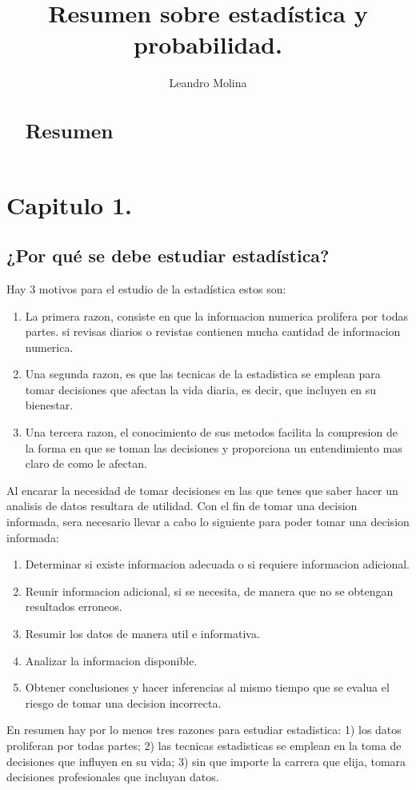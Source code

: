 \documentclass[]{article}
\title{Resumen sobre estadística y probabilidad.}
\author{Leandro Molina}
\begin{document}
\maketitle

\begin{abstract}
	\section*{Resumen}
\end{abstract}
\pagebreak

\tableofcontents

\pagebreak
\section{Capitulo 1.}
\subsection{¿Por qué se debe estudiar estadística?}
Hay 3 motivos para el estudio de la estadística estos son:
\begin{enumerate}
	\item La primera razon, consiste en que la informacion numerica prolifera por todas partes. si revisas diarios o revistas contienen mucha cantidad de informacion numerica.
	\item Una segunda razon, es que las tecnicas de la estadistica se emplean para tomar decisiones que afectan la vida diaria, es decir, que incluyen en su bienestar.
	\item Una tercera razon, el conocimiento de sus metodos facilita la compresion de la forma en que se toman las decisiones y proporciona un entendimiento mas claro de como le afectan. 
\end{enumerate}
Al encarar la necesidad de tomar decisiones en las que tenes que saber hacer un analisis de datos resultara de utilidad. Con el fin de tomar una decision informada, sera necesario llevar a cabo lo siguiente para poder tomar una decision informada:
\begin{enumerate}
	\item Determinar si existe informacion adecuada o si requiere informacion adicional.
	\item Reunir informacion adicional, si se necesita, de manera que no se obtengan resultados erroneos.
	\item Resumir los datos de manera util e informativa.
	\item Analizar la informacion disponible.
	\item Obtener conclusiones y hacer inferencias al mismo tiempo que se evalua el riesgo de tomar una decision incorrecta.
\end{enumerate}
En resumen hay por lo menos tres razones para estudiar estadistica: 1) los datos proliferan por todas partes; 2) las tecnicas estadisticas se emplean en la toma de decisiones que influyen en su vida; 3) sin que importe la carrera que elija, tomara decisiones profesionales que incluyan datos.
\end{document}
